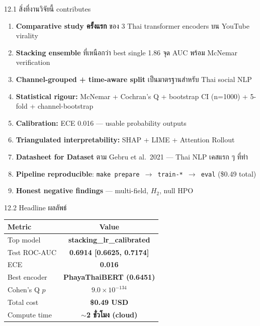 \documentclass[aspectratio=169,11pt,xcolor=dvipsnames]{beamer}
\newcommand{\hl}[1]{\textcolor{kmitlOrange}{\textbf{#1}}}
\newcommand{\hlb}[1]{\textcolor{kmitlBlue}{\textbf{#1}}}
\begin{document}
\begin{frame}{12.1 สิ่งที่งานวิจัยนี้ contributes}
  \begin{enumerate}\setlength\itemsep{0.4em}
    \item \hlb{Comparative study ครั้งแรก} ของ 3 Thai transformer encoders บน YouTube virality
    \item \hlb{Stacking ensemble} ที่เหนือกว่า best single 1.86 จุด AUC พร้อม McNemar verification
    \item \hlb{Channel-grouped + time-aware split} เป็นมาตรฐานสำหรับ Thai social NLP
    \item \hlb{Statistical rigour:} McNemar + Cochran's Q + bootstrap CI (n=1000) + 5-fold + channel-bootstrap
    \item \hlb{Calibration:} ECE 0.016 — usable probability outputs
    \item \hlb{Triangulated interpretability:} SHAP + LIME + Attention Rollout
    \item \hlb{Datasheet for Dataset} ตาม Gebru et al.\ 2021 — Thai NLP เคสแรก ๆ ที่ทำ
    \item \hlb{Pipeline reproducible}: \texttt{make prepare $\rightarrow$ train-* $\rightarrow$ eval} (\$0.49 total)
    \item \hlb{Honest negative findings} — multi-field, $H_2$, null HPO
  \end{enumerate}
\end{frame}

\begin{frame}{12.2 Headline ผลลัพธ์}
  \begin{center}
    \Large
    \begin{tabular}{lc}
      \toprule
      \textbf{Metric} & \textbf{Value}\\
      \midrule
      Top model     & \hl{stacking\_lr\_calibrated}\\
      Test ROC-AUC  & \hl{0.6914 [0.6625, 0.7174]}\\
      ECE           & \hl{0.016}\\
      Best encoder  & \hl{PhayaThaiBERT (0.6451)}\\
      Cohen's Q $p$ & \hl{$9.0 \times 10^{-134}$}\\
      Total cost    & \hl{\$0.49 USD}\\
      Compute time  & \hl{$\sim$2 ชั่วโมง (cloud)}\\
      \bottomrule
    \end{tabular}
  \end{center}
\end{frame}
\end{document}
